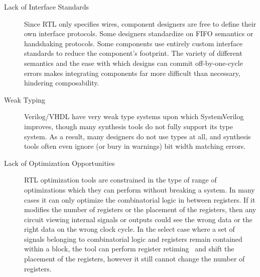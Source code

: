 \begin{description}
    \item[Lack of Interface Standards] Since RTL only specifies wires,
    component designers are free to define their own interface protocols. Some
    designers standardize on FIFO semantics or handshaking protocols. Some
    components use entirely custom interface standards to reduce the
    component's footprint. The variety of different semantics and the ease
    with which designs can commit off-by-one-cycle errors makes integrating
    components far more difficult than necessary, hindering composability.

    \item[Weak Typing] Verilog/VHDL have very weak type systems upon which
    SystemVerilog improves, though many synthesis tools do not fully support
    its type system. As a result, many designers do not use types at all, and
    synthesis tools often even ignore (or bury in warnings) bit width matching
    errors.

    \item[Lack of Optimization Opportunities] RTL optimization tools are
    constrained in the type of range of optimizations which they can perform
    without breaking a system. In many cases it can only optimize the
    combinatorial logic in between registers. If it modifies the number of
    registers or the placement of the registers, then any circuit viewing
    internal signals or outputs could see the wrong data or the right data on
    the wrong clock cycle. In the select case where a set of signals belonging
    to combinatorial logic and registers remain contained within a block, the
    tool can perform register retiming~\cite{leiserson1983optimizing} and
    shift the placement of the registers, however it still cannot change the
    number of registers.

\end{description}


